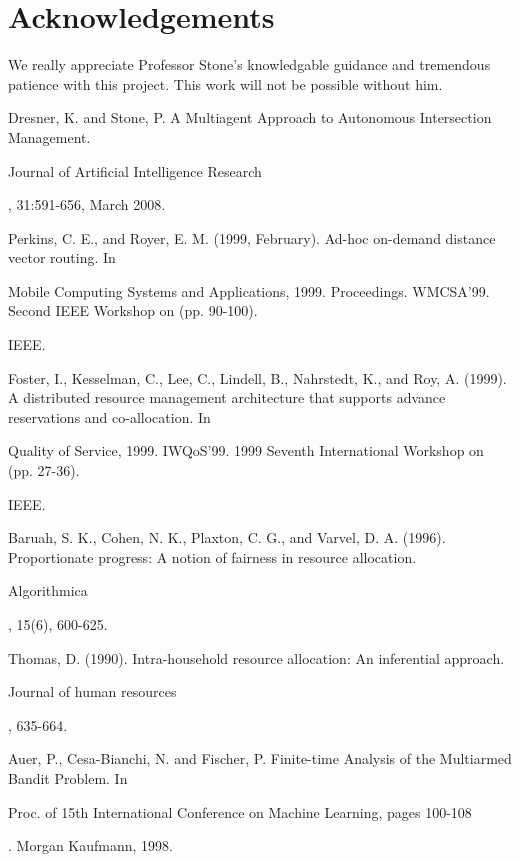 \documentclass[conference]{IEEEtran}
\begin{document}
\section{Acknowledgements}
We really appreciate Professor Stone's knowledgable guidance and tremendous patience with this project. This work will not be possible without him.

\begin{thebibliography}{1}
Dresner, K. and Stone, P. A Multiagent Approach to Autonomous Intersection Management. \begin{em}Journal of Artificial Intelligence Research\end{em}, 31:591-656, March 2008.

Perkins, C. E., and Royer, E. M. (1999, February). Ad-hoc on-demand distance vector routing. In \begin{em}Mobile Computing Systems and Applications, 1999. Proceedings. WMCSA'99. Second IEEE Workshop on (pp. 90-100).\end{em} IEEE.

Foster, I., Kesselman, C., Lee, C., Lindell, B., Nahrstedt, K., and Roy, A. (1999). A distributed resource management architecture that supports advance reservations and co-allocation. In \begin{em}Quality of Service, 1999. IWQoS'99. 1999 Seventh International Workshop on (pp. 27-36).\end{em} IEEE.

Baruah, S. K., Cohen, N. K., Plaxton, C. G., and Varvel, D. A. (1996). Proportionate progress: A notion of fairness in resource allocation. \begin{em}Algorithmica\end{em}, 15(6), 600-625.

Thomas, D. (1990). Intra-household resource allocation: An inferential approach. \begin{em}Journal of human resources\end{em}, 635-664.

Auer, P., Cesa-Bianchi, N. and Fischer, P. Finite-time Analysis of the Multiarmed Bandit Problem. In \begin{em} Proc. of 15th International Conference on Machine Learning, pages 100-108\end{em}. Morgan Kaufmann, 1998.


\end{thebibliography}
\end{document}
